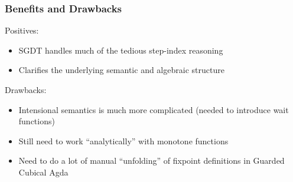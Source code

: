\documentclass[
	11pt, %
]{beamer}
\begin{document}
\begin{frame}
	\frametitle{Benefits and Drawbacks}

	Positives:
	\begin{itemize}
		\item SGDT handles much of the tedious step-index reasoning
		\item Clarifies the underlying semantic and algebraic structure
	\end{itemize}

	Drawbacks:
	\begin{itemize}
		\item 	Intensional semantics is much more complicated (needed to introduce wait functions)
		\item 	Still need to work ``analytically'' with monotone functions
		\item   Need to do a lot of manual ``unfolding'' of fixpoint definitions in Guarded Cubical Agda
	\end{itemize}

	

\end{frame}
\end{document}

